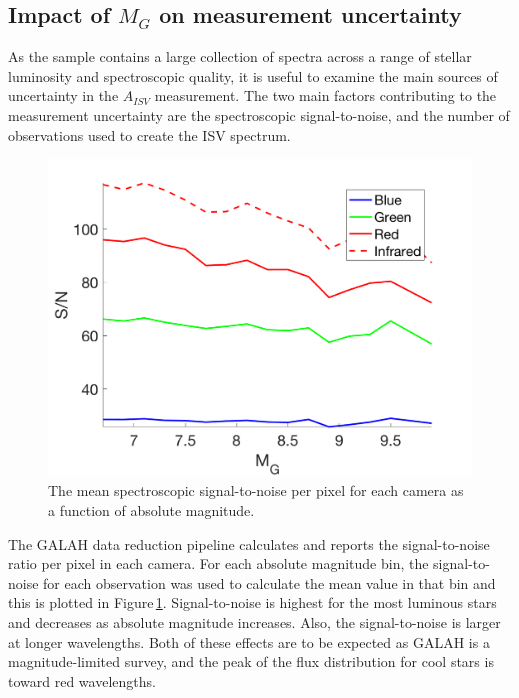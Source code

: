 \subsection{Impact of $M_G$ on measurement uncertainty}
\label{secGALAHuncertainty}
As the sample contains a large collection of spectra across a range of stellar luminosity and spectroscopic quality, it is useful to examine the main sources of uncertainty in the $A_{ISV}$ measurement. The two main factors contributing to the measurement uncertainty are the spectroscopic signal-to-noise, and the number of observations used to create the ISV spectrum.\\

\begin{figure}
    \centering
    \includegraphics[width=.8\textwidth]{GALAH_SN.png}
    \caption{The mean spectroscopic signal-to-noise per pixel for each camera as a function of absolute magnitude.}
    \label{figGALAHsn_mg}
\end{figure}

The GALAH data reduction pipeline calculates and reports the signal-to-noise ratio per pixel in each camera. For each absolute magnitude bin, the signal-to-noise for each observation was used to calculate the mean value in that bin and this is plotted in Figure\,\ref{figGALAHsn_mg}. Signal-to-noise is highest for the most luminous stars and decreases as absolute magnitude increases. Also, the signal-to-noise is larger at longer wavelengths. Both of these effects are to be expected as GALAH is a magnitude-limited survey, and the peak of the flux distribution for cool stars is toward red wavelengths.\\

